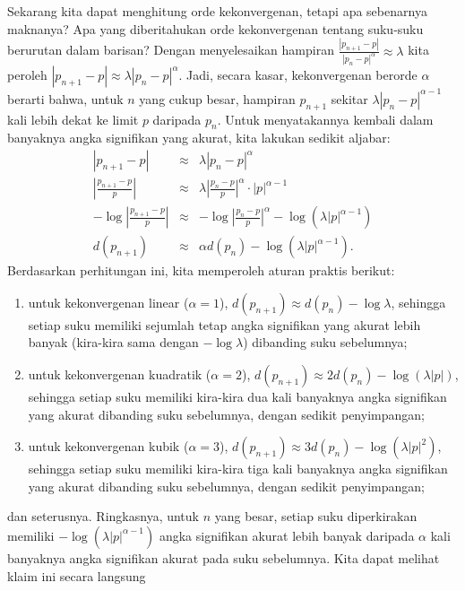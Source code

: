 Sekarang kita dapat menghitung orde kekonvergenan,
tetapi apa sebenarnya maknanya? Apa yang diberitahukan orde kekonvergenan
tentang suku-suku berurutan dalam barisan? Dengan menyelesaikan hampiran
$\frac{\left|p_{n+1}-p\right|}{\left|p_{n}-p\right|^{\alpha}}\approx\lambda$
kita peroleh $|p_{n+1}-p|\approx\lambda|p_{n}-p|^{\alpha}$. Jadi,
secara kasar, kekonvergenan berorde $\alpha$ berarti bahwa, untuk
$n$ yang cukup besar, hampiran $p_{n+1}$ sekitar $\lambda|p_{n}-p|^{\alpha-1}$
kali lebih dekat ke limit $p$ daripada $p_{n}$. Untuk menyatakannya
kembali dalam banyaknya angka signifikan yang akurat, kita lakukan
sedikit aljabar:
\begin{eqnarray*}
|p_{n+1}-p| & \approx & \lambda|p_{n}-p|^{\alpha}\\
\left|\frac{p_{n+1}-p}{p}\right| & \approx & \lambda\left|\frac{p_{n}-p}{p}\right|^{\alpha}\cdot|p|^{\alpha-1}\\
-\log\left|\frac{p_{n+1}-p}{p}\right| & \approx & -\log\left|\frac{p_{n}-p}{p}\right|^{\alpha}-\log\left(\lambda|p|^{\alpha-1}\right)\\
d(p_{n+1}) & \approx & \alpha d(p_{n})-\log\left(\lambda|p|^{\alpha-1}\right).
\end{eqnarray*}
Berdasarkan perhitungan ini, kita memperoleh aturan praktis berikut:
\begin{enumerate}
\item untuk kekonvergenan linear ($\alpha=1$), $d(p_{n+1})\approx d(p_{n})-\log\lambda$,
sehingga setiap suku memiliki sejumlah tetap angka signifikan yang
akurat lebih banyak (kira-kira sama dengan $-\log\lambda$) dibanding
suku sebelumnya;
\item untuk kekonvergenan kuadratik ($\alpha=2$), $d(p_{n+1})\approx2d(p_{n})-\log\left(\lambda|p|\right)$,
sehingga setiap suku memiliki kira-kira dua kali banyaknya angka signifikan
yang akurat dibanding suku sebelumnya, dengan sedikit penyimpangan;
\item untuk kekonvergenan kubik ($\alpha=3$), $d(p_{n+1})\approx3d(p_{n})-\log\left(\lambda|p|^{2}\right)$,
sehingga setiap suku memiliki kira-kira tiga kali banyaknya angka
signifikan yang akurat dibanding suku sebelumnya, dengan sedikit penyimpangan;
\end{enumerate}
dan seterusnya. Ringkasnya, untuk $n$ yang besar, setiap suku diperkirakan
memiliki $-\log\left(\lambda|p|^{\alpha-1}\right)$ angka signifikan
akurat lebih banyak daripada $\alpha$ kali banyaknya angka signifikan
akurat pada suku sebelumnya. Kita dapat melihat klaim ini secara langsung
